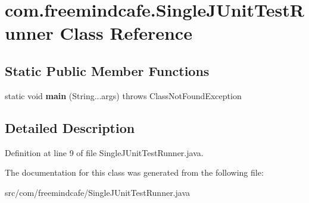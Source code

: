 \hypertarget{classcom_1_1freemindcafe_1_1_single_j_unit_test_runner}{}\section{com.\+freemindcafe.\+Single\+J\+Unit\+Test\+Runner Class Reference}
\label{classcom_1_1freemindcafe_1_1_single_j_unit_test_runner}
\subsection*{Static Public Member Functions}
\begin{DoxyCompactItemize}
\item 
\hypertarget{classcom_1_1freemindcafe_1_1_single_j_unit_test_runner_a6e8d1133ef0f6a2344beba873c43bd3f}{}static void {\bfseries main} (String...\+args)  throws Class\+Not\+Found\+Exception \label{classcom_1_1freemindcafe_1_1_single_j_unit_test_runner_a6e8d1133ef0f6a2344beba873c43bd3f}

\end{DoxyCompactItemize}


\subsection{Detailed Description}


Definition at line 9 of file Single\+J\+Unit\+Test\+Runner.\+java.



The documentation for this class was generated from the following file\+:\begin{DoxyCompactItemize}
\item 
src/com/freemindcafe/Single\+J\+Unit\+Test\+Runner.\+java\end{DoxyCompactItemize}
